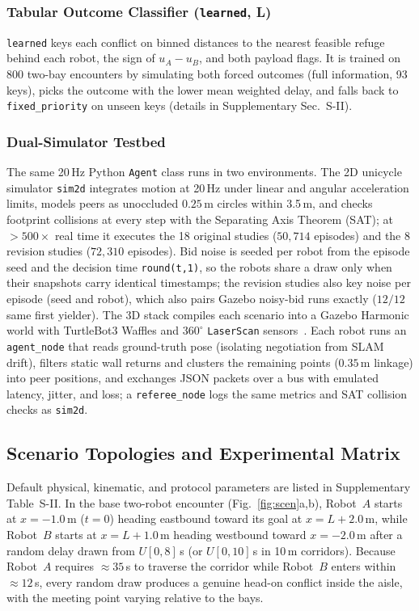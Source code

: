 \subsubsection{Tabular Outcome Classifier (\texttt{learned}, L)}
\texttt{learned} keys each conflict on binned distances to the nearest feasible refuge behind each robot, the sign of $u_A-u_B$, and both payload flags. It is trained on 800 two-bay encounters by simulating both forced outcomes (full information, 93 keys), picks the outcome with the lower mean weighted delay, and falls back to \texttt{fixed\_priority} on unseen keys (details in Supplementary Sec.~S-II).


\subsubsection{Dual-Simulator Testbed}
The same 20\,Hz Python \texttt{Agent} class runs in two environments. The 2D unicycle simulator \texttt{sim2d} integrates motion at 20\,Hz under linear and angular acceleration limits, models peers as unoccluded $0.25$\,m circles within 3.5\,m, and checks footprint collisions at every step with the Separating Axis Theorem (SAT); at $>500\times$ real time it executes the 18 original studies ($50{,}714$ episodes) and the 8 revision studies ($72{,}310$ episodes). Bid noise is seeded per robot from the episode seed and the decision time \texttt{round(t,1)}, so the robots share a draw only when their snapshots carry identical timestamps; the revision studies also key noise per episode (seed and robot), which also pairs Gazebo noisy-bid runs exactly ($12/12$ same first yielder). The 3D stack compiles each scenario into a Gazebo Harmonic world with TurtleBot3 Waffles and $360^\circ$ \texttt{LaserScan} sensors~\cite{turtlebot3,gazebosim}. Each robot runs an \texttt{agent\_node} that reads ground-truth pose (isolating negotiation from SLAM drift), filters static wall returns and clusters the remaining points ($0.35$\,m linkage) into peer positions, and exchanges JSON packets over a bus with emulated latency, jitter, and loss; a \texttt{referee\_node} logs the same metrics and SAT collision checks as \texttt{sim2d}.

\subsection{Scenario Topologies and Experimental Matrix}
Default physical, kinematic, and protocol parameters are listed in Supplementary Table~S-II. In the base two-robot encounter (Fig.~\ref{fig:scen}a,b), Robot~$A$ starts at $x = -1.0$\,m ($t = 0$) heading eastbound toward its goal at $x = L + 2.0$\,m, while Robot~$B$ starts at $x = L + 1.0$\,m heading westbound toward $x = -2.0$\,m after a random delay drawn from $U[0, 8]$\,s (or $U[0, 10]$\,s in 10\,m corridors). Because Robot~$A$ requires $\approx 35$\,s to traverse the corridor while Robot~$B$ enters within $\approx 12$\,s, every random draw produces a genuine head-on conflict inside the aisle, with the meeting point varying relative to the bays.

